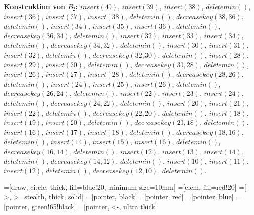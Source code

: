 \documentclass{article}
\begin{document}
\textbf{Konstruktion von $B_2$:} \newline
$insert(40)$, $insert(39)$, $insert(38)$, $deletemin()$, \newline
$insert(36)$, $insert(37)$, $insert(38)$, $deletemin()$, $decreasekey(38, 36)$, $deletemin()$, \newline
$insert(34)$, $insert(35)$, $insert(36)$, $deletemin()$, $decreasekey(36, 34)$, $deletemin()$, \newline
$insert(32)$, $insert(33)$, $insert(34)$, $deletemin()$, $decreasekey(34, 32)$, $deletemin()$, \newline
$insert(30)$, $insert(31)$, $insert(32)$, $deletemin()$, $decreasekey(32, 30)$, $deletemin()$, \newline
$insert(28)$, $insert(29)$, $insert(30)$, $deletemin()$, $decreasekey(30, 28)$, $deletemin()$, \newline
$insert(26)$, $insert(27)$, $insert(28)$, $deletemin()$, $decreasekey(28, 26)$, $deletemin()$, \newline
$insert(24)$, $insert(25)$, $insert(26)$, $deletemin()$, $decreasekey(26, 24)$, $deletemin()$, \newline
$insert(22)$, $insert(23)$, $insert(24)$, $deletemin()$, $decreasekey(24, 22)$, $deletemin()$, \newline
$insert(20)$, $insert(21)$, $insert(22)$, $deletemin()$, $decreasekey(22, 20)$, $deletemin()$, \newline
$insert(18)$, $insert(19)$, $insert(20)$, $deletemin()$, $decreasekey(20, 18)$, $deletemin()$, \newline
$insert(16)$, $insert(17)$, $insert(18)$, $deletemin()$, $decreasekey(18, 16)$, $deletemin()$, \newline
$insert(14)$, $insert(15)$, $insert(16)$, $deletemin()$, $decreasekey(16, 14)$, $deletemin()$, \newline
$insert(12)$, $insert(13)$, $insert(14)$, $deletemin()$, $decreasekey(14, 12)$, $deletemin()$, \newline
$insert(10)$, $insert(11)$, $insert(12)$, $deletemin()$, $decreasekey(12, 10)$, $deletemin()$.

=[draw, circle, thick, fill=blue!20, minimum size=10mm]
=[elem, fill=red!20]
=[->, >=stealth, thick, solid]
=[pointer, black]
=[pointer, red]
=[pointer, blue]
=[pointer, green!65!black]
=[pointer, <-, ultra thick]
\end{document}

